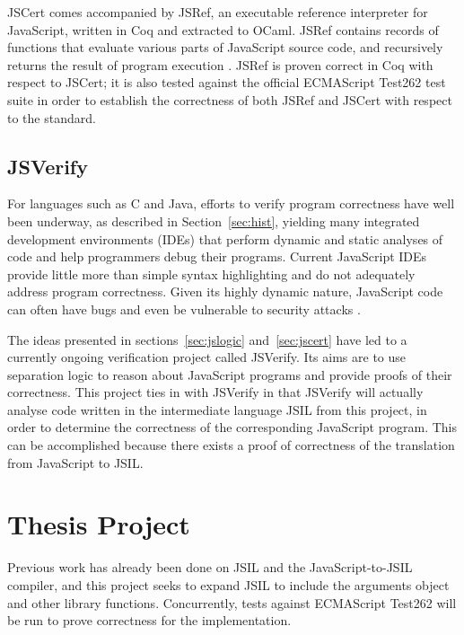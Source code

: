 \documentclass[a4paper,11pt,twoside]{report}
\newif\ifComments
\newcommand{\pmax}[1]{%
\ifComments
\begin{center}
\fbox{%
\begin{minipage}{3in} \color{blue}
{\bf PM:} {\rm #1}
\end{minipage}
}
\end{center}
\fi
}
\begin{document}

JSCert comes accompanied by JSRef, an executable reference interpreter for JavaScript, written in Coq and extracted to OCaml. JSRef contains records of functions that evaluate various parts of JavaScript source code, and recursively returns the result of program execution \cite{Bodin:2014}. JSRef is proven correct in Coq with respect to JSCert; it is also tested against the official ECMAScript Test262 test suite in order to establish the correctness of both JSRef and JSCert with respect to the  standard.

\subsection{JSVerify}\label{sec:jsverify}
For languages such as C and Java, efforts to verify program correctness have well been underway, as described in Section~\ref{sec:hist}, yielding many integrated development environments (IDEs) that perform dynamic and static analyses of code and help programmers debug their programs. Current JavaScript IDEs provide little more than simple syntax highlighting and do not adequately address program correctness. Given its highly dynamic nature, JavaScript code can often have bugs \cite{Gardner:2012} and even be vulnerable to security attacks \cite{Lee:2007}. 

The ideas presented in sections~\ref{sec:jslogic} and~\ref{sec:jscert} have led to a currently ongoing verification project called JSVerify. Its aims are to use separation logic to reason about JavaScript programs and provide proofs of their correctness. This project ties in with JSVerify in that JSVerify will actually analyse code written in the intermediate language JSIL from this project, in order to determine the correctness of the corresponding JavaScript program. This can be accomplished because there exists a proof of correctness of the translation from JavaScript to JSIL.

\section{Thesis Project}

\pmax{What is the project?}

Previous work has already been done on JSIL and the JavaScript-to-JSIL compiler, and this project seeks to expand JSIL to include the arguments object and other library functions. Concurrently, tests against ECMAScript Test262 will be run to prove correctness for the implementation. 
\end{document}
